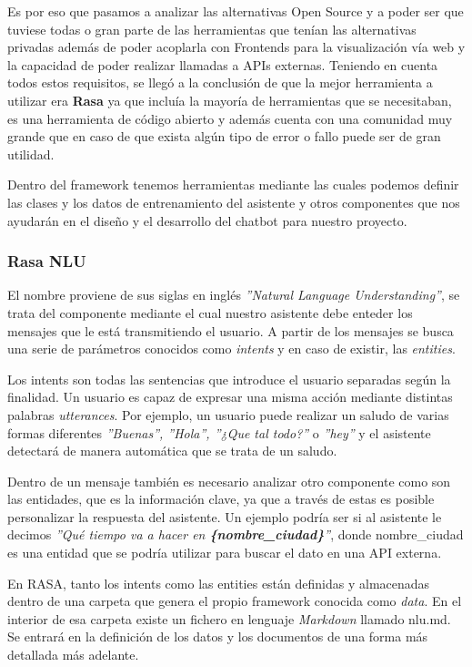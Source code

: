 Es por eso que pasamos a analizar las alternativas Open Source y a poder ser que tuviese todas o gran parte de las herramientas que tenían las alternativas privadas además de poder acoplarla con Frontends para la visualización vía web y la capacidad de poder realizar llamadas a APIs externas. Teniendo en cuenta todos estos requisitos, se llegó a la conclusión de que la mejor herramienta a utilizar era \textbf{Rasa} ya que incluía la mayoría de herramientas que se necesitaban, es una herramienta de código abierto y además cuenta con una comunidad muy grande que en caso de que exista algún tipo de error o fallo puede ser de gran utilidad.

Dentro del framework tenemos herramientas mediante las cuales podemos definir las clases y los datos de entrenamiento del asistente y otros componentes que nos ayudarán en el diseño y el desarrollo del chatbot para nuestro proyecto. 

\subsubsection{Rasa NLU}
El nombre proviene de sus siglas en inglés \textit{''Natural Language Understanding''}, se trata del componente mediante el cual nuestro asistente debe enteder los mensajes que le está transmitiendo el usuario. A partir de los mensajes se busca una serie de parámetros conocidos como \textit{intents} y en caso de existir, las \textit{entities}.

Los intents son todas las sentencias que introduce el usuario separadas según la finalidad. Un usuario es capaz de expresar una misma acción mediante distintas palabras \textit{utterances}. Por ejemplo, un usuario puede realizar un saludo de varias formas diferentes \textit{''Buenas'', ''Hola'', ''¿Que tal todo?''} o \textit{''hey''} y el asistente detectará de manera automática que se trata de un saludo.

Dentro de un mensaje también es necesario analizar otro componente como son las entidades, que es la información clave, ya que a través de estas es posible personalizar la respuesta del asistente. Un ejemplo podría ser si al asistente le decimos \textit{''Qué tiempo va a hacer en \textbf{\{nombre\_ciudad\}}''}, donde nombre\_ciudad es una entidad que se podría utilizar para buscar el dato en una API externa. 

En RASA, tanto los intents como las entities están definidas y almacenadas dentro de una carpeta que genera el propio framework conocida como \textit{data}. En el interior de esa carpeta existe un fichero en lenguaje \textit{Markdown} llamado nlu.md. Se entrará en la definición de los datos y los documentos de una forma más detallada más adelante. 

